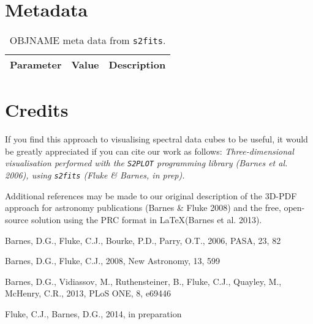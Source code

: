 \documentclass{article}
\begin{document}
\section{Metadata}

\begin{table}[h]
\caption{{OBJNAME} meta data from {\tt s2fits}.}
\label{tbl:meta}
\begin{center}
\begin{tabular}{lrl}
{\bf Parameter} & {\bf Value} & {\bf Description}\\
\hline 

\hline
\end{tabular}
\end{center}
\end{table}

\section*{Credits}
If you find this approach to visualising spectral data cubes to be useful, 
it would be greatly appreciated if you can cite our work as follows:
{\em Three-dimensional visualisation performed with the {\tt S2PLOT} programming 
library (Barnes et al. 2006), using {\tt s2fits} (Fluke \& Barnes, {\em in prep}).}

Additional references may be made to our original description of the 3D-PDF approach
for astronomy publications (Barnes \& Fluke 2008) and the free, open-source solution 
using the PRC format in \LaTeX (Barnes et al. 2013). 


\begin{thebibliography}{99}
Barnes, D.G., Fluke, C.J., Bourke, P.D., Parry, O.T., 2006, PASA, 23, 82

Barnes, D.G., Fluke, C.J., 2008, New Astronomy, 13, 599 

Barnes, D.G., Vidiassov, M., Ruthensteiner, B., Fluke, C.J., Quayley, M., McHenry, C.R., 2013, PLoS ONE, 8, e69446

Fluke, C.J., Barnes, D.G., 2014, in preparation

\end{thebibliography}
\end{document}
